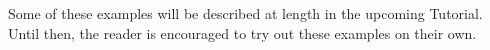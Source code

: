 \begin{description}
\end{description}

Some of these examples will be described at length in the upcoming Tutorial.
Until then, the reader is encouraged to try out these examples on their own.

